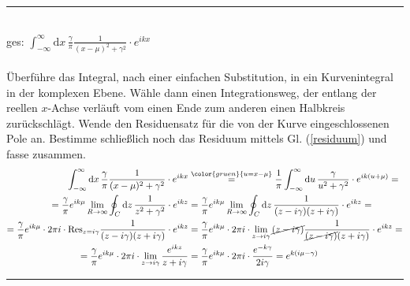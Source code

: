 \documentclass{article}
\newcommand{\diff}{\mathrm{d}}
\newcommand{\comment}[1]{{\color{gruen} {#1}}}
\begin{document}
{\color{blue}
\hrule
	\\
	ges: $\int_{-\infty}^\infty \diff x\, \frac{\gamma}{\pi} \frac{1}{(x-\mu)^2 + \gamma^2}\cdot e^{ikx}$\\
	\\
	Überführe das Integral, nach einer einfachen Substitution, in ein Kurvenintegral in der komplexen Ebene. Wähle dann einen Integrationsweg, der entlang der reellen $x$-Achse verläuft vom einen Ende zum anderen einen Halbkreis zurückschlägt. Wende den Residuensatz für die von der Kurve eingeschlossenen Pole an. Bestimme schließlich noch das Residuum mittels Gl. (\ref{residuum}) und fasse zusammen.
	\begin{align*}
		\int_{-\infty}^\infty \diff x\, \frac{\gamma}{\pi} \frac{1}{(x-\mu)^2 + \gamma^2}\cdot e^{ikx} &\stackrel{\comment{ u=x-\mu }}{=} \frac{1}{\pi} \int_{-\infty}^\infty \diff u\, \frac{\gamma}{u^2 + \gamma^2}\cdot e^{ik(u+\mu)} = \\
		= \frac{\gamma}{\pi} e^{ik\mu} \lim_{R\to\infty} \oint_C \diff z\, \frac{1}{z^2 + \gamma^2} \cdot e^{ikz} &= \frac{\gamma}{\pi} e^{ik\mu} \lim_{R\to\infty} \oint_C \diff z\, \frac{1}{(z - i\gamma)(z + i\gamma)} \cdot e^{ikz} = \\
		= \frac{\gamma}{\pi} e^{ik\mu} \cdot 2\pi i \cdot \text{Res}_{z=i\gamma} \frac{1}{(z - i\gamma)(z + i\gamma)} \cdot e^{ikz} &= \frac{\gamma}{\pi} e^{ik\mu} \cdot 2\pi i \cdot \lim_{z\to i\gamma} \cancel{(z - i\gamma)} \frac{1}{\cancel{(z - i\gamma)}(z + i\gamma)} \cdot e^{ikz} = \\
		= \frac{\gamma}{\pi} e^{ik\mu} \cdot 2\pi i \cdot \lim_{z\to i\gamma} \frac{e^{ikz}}{z + i\gamma} &= \frac{\gamma}{\pi} e^{ik\mu} \cdot 2\pi i \cdot \frac{e^{-k\gamma}}{2i\gamma} = e^{k(i\mu - \gamma)}
	\end{align*}
\hrule
}


\newpage
\end{document}
